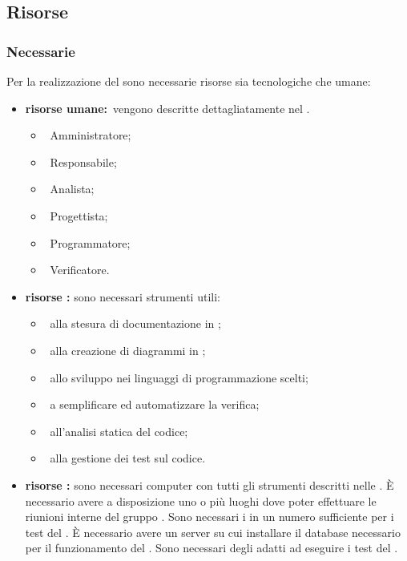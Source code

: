 	\subsection{Risorse}
		\subsubsection{Necessarie}
			Per la realizzazione del  sono necessarie risorse sia tecnologiche che umane:
			\begin{itemize}
				\item \textbf{risorse umane:}\ vengono descritte dettagliatamente nel \PPdoc.
				\begin{itemize}
					\item\ Amministratore;
					\item\ Responsabile;
					\item\ Analista;
					\item\ Progettista;
					\item\ Programmatore;
					\item\ Verificatore.
				\end{itemize}
				\item \textbf{risorse :} sono necessari strumenti  utili:
				\begin{itemize}
					\item\ alla stesura di documentazione in ;
					\item\ alla creazione di diagrammi in ;
					\item\ allo sviluppo nei linguaggi di programmazione scelti;
					\item\ a semplificare ed automatizzare la verifica;
					\item\ all'analisi statica del codice;
					\item\ alla gestione dei test sul codice.
				\end{itemize}
				\item \textbf{risorse :} sono necessari computer con tutti gli strumenti  descritti nelle \NPdoc. È necessario avere a disposizione uno o più luoghi dove poter effettuare le riunioni interne del gruppo \AUTORE. Sono necessari i  in un numero sufficiente per i test del . È necessario avere un server su cui installare il database necessario per il funzionamento del . Sono necessari degli  adatti ad eseguire i test del .
			\end{itemize}
